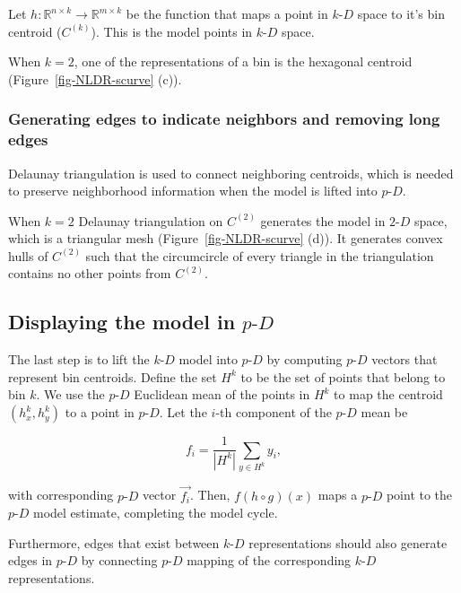 \documentclass[
  12pt]{article}
\newcommand\pD{$p\text{-}D$}
\newcommand\kD{$k\text{-}D$}
\newcommand\gD{$2\text{-}D$}
\begin{document}
Let \(h : \mathbb{R}^{n\times k} \rightarrow \mathbb{R}^{m\times k}\) be
the function that maps a point in \kD{} space to it's bin centroid
(\(C^{(k)}\)). This is the model points in \kD{} space.

When \(k = 2\), one of the representations of a bin is the hexagonal
centroid (Figure~\ref{fig-NLDR-scurve} (c)).

\subsubsection{Generating edges to indicate neighbors and removing long
edges}\label{generating-edges-to-indicate-neighbors-and-removing-long-edges}

Delaunay triangulation is used to connect neighboring centroids, which
is needed to preserve neighborhood information when the model is lifted
into \pD{}.

When \(k = 2\) Delaunay triangulation on \(C^{(2)}\) generates the model
in \gD{} space, which is a triangular mesh (Figure~\ref{fig-NLDR-scurve}
(d)). It generates convex hulls of \(C^{(2)}\) such that the
circumcircle of every triangle in the triangulation contains no other
points from \(C^{(2)}\).

\subsection{\texorpdfstring{Displaying the model in
\pD{}}{Displaying the model in }}\label{displaying-the-model-in}

The last step is to lift the \kD{} model into \pD{} by computing \pD{}
vectors that represent bin centroids. Define the set \(H^k\) to be the
set of points that belong to bin \(k\). We use the \pD{} Euclidean mean
of the points in \(H^k\) to map the centroid \((h_x^k, h_y^k)\) to a
point in \pD{}. Let the \(i\)-th component of the \pD{} mean be

\[f_i = \frac{1}{\left|H^k\right|}\sum_{y \in H^k} y_i,\]

with corresponding \pD{} vector \(\vec{f_i}\). Then, \(f(h\circ g)(x)\)
maps a \pD{} point to the \pD{} model estimate, completing the model
cycle.

Furthermore, edges that exist between \kD{} representations should also
generate edges in \pD{} by connecting \pD{} mapping of the corresponding
\kD{} representations.
\end{document}
